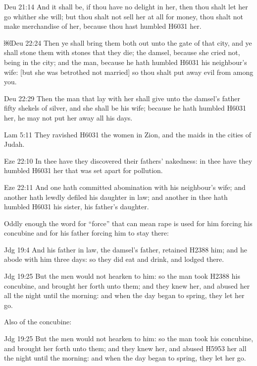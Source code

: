 \documentclass[11pt]{article}
\begin{document}
Deu 21:14
And it shall be, if thou have no delight in her, then thou shalt let her go whither she will; but thou shalt not sell her at all for money, thou shalt not make merchandise of her, because thou hast humbled H6031 her.


￼Deu 22:24
Then ye shall bring them both out unto the gate of that city, and ye shall stone them with stones that they die; the damsel, because she cried not, being in the city; and the man, because he hath humbled H6031 his neighbour's wife: [but she was betrothed not married] so thou shalt put away evil from among you.


Deu 22:29
Then the man that lay with her shall give unto the damsel's father fifty shekels of silver, and she shall be his wife; because he hath humbled H6031 her, he may not put her away all his days.


Lam 5:11
They ravished H6031 the women in Zion, and the maids in the cities of Judah.


Eze 22:10
In thee have they discovered their fathers' nakedness: in thee have they humbled H6031 her that was set apart for pollution.


Eze 22:11
And one hath committed abomination with his neighbour's wife; and another hath lewdly defiled his daughter in law; and another in thee hath humbled H6031 his sister, his father's daughter.





Oddly enough the word for “force” that can mean rape is used for him forcing his concubine and for his father forcing him to stay there:

Jdg 19:4
And his father in law, the damsel's father, retained H2388 him; and he abode with him three days: so they did eat and drink, and lodged there.


Jdg 19:25
But the men would not hearken to him: so the man took H2388 his concubine, and brought her forth unto them; and they knew her, and abused her all the night until the morning: and when the day began to spring, they let her go.




Also of the concubine:

Jdg 19:25
But the men would not hearken to him: so the man took his concubine, and brought her forth unto them; and they knew her, and abused H5953 her all the night until the morning: and when the day began to spring, they let her go.
\end{document}
